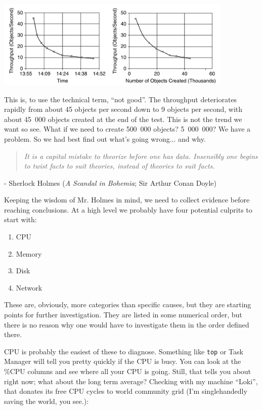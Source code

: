 \documentclass[a4paper]{report}
\begin{document}
\begin{center}
	\includegraphics[width=0.85\textwidth]{images/batch-job-scalability.png}
\end{center}

This is, to use the technical term, ``not good''. The throughput deteriorates rapidly from about 45 objects per second down to 9 objects per second, with about 45~000 objects created at the end of the test. This is not the trend we want so see. What if we need to create 500~000 objects? 5~000~000? We have a problem. So we had best find out what's going wrong... and why.

\begin{quote}
\textit{It is a capital mistake to theorize before one has data. Insensibly one begins to twist facts to suit theories, instead of theories to suit facts.}
\end{quote}
\hfill - Sherlock Holmes (\textit{A Scandal in Bohemia}; Sir Arthur Conan Doyle)

Keeping the wisdom of Mr. Holmes in mind, we need to collect evidence before reaching conclusions. At a high level we probably have four potential culprits to start with:
\begin{enumerate}
	\item CPU
	\item Memory
	\item Disk
	\item Network
\end{enumerate}

These are, obviously, more categories than specific causes, but they are starting points for further investigation. They are listed in some numerical order, but there is no reason why one would have to investigate them in the order defined there.

CPU is probably the easiest of these to diagnose. Something like \texttt{top} or Task Manager will tell you pretty quickly if the CPU is busy. You can look at the \%CPU columns and see where all your CPU is going. Still, that tells you about right now; what about the long term average? Checking with my machine ``Loki'', that donates its free CPU cycles to world community grid (I'm singlehandedly saving the world, you see.):
\end{document}
